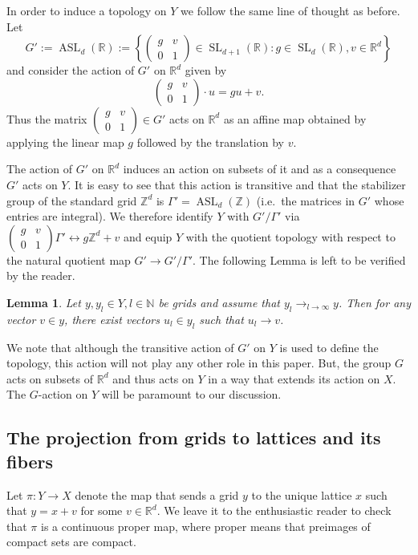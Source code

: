 \documentclass[reqno,11pt, twoside]{amsart}
\theoremstyle{plain}
\newtheorem{lem}[thm]{Lemma}
\theoremstyle{definition}
\theoremstyle{definition}
\theoremstyle{remark}
\numberwithin{equation}{section}
\newcommand{\SL}{\operatorname{SL}}
\newcommand{\Ga}{\Gamma}
\newcommand{\bR}{\mathbb{R}}
\newcommand{\bZ}{\mathbb{Z}}
\newcommand{\bN}{\mathbb{N}}
\newcommand\seta[1]{\left\{#1\right\}}
\newcommand\pa[1]{\left(#1\right)}
\newcommand\on[1]{\operatorname{#1}}
\newcommand\mat[1]{\pa{\begin{matrix}#1\end{matrix}}}
\newcommand\smallmat[1]{\pa{\begin{smallmatrix}#1\end{smallmatrix}}}
\begin{document}
In order to induce a topology on $Y$ we follow the same line of thought as before. Let 
$$G':=\on{ASL}_d(\bR) := \seta{\mat{g&v\\ 0&1}\in \SL_{d+1}(\bR):g\in \SL_d(\bR), v\in \bR^d}$$
and consider the action of $G'$ on $\bR^d$ given by 
$$\mat{g&v\\ 0&1}\cdot u = gu+v.$$
Thus the matrix $\smallmat{g&v\\0&1}\in G'$ acts on $\bR^d$ as an affine map obtained by applying the linear map $g$ followed by the translation by $v$.

The action of $G'$ on $\bR^d$ induces an action on subsets of it and as a consequence $G'$ acts on $Y$.
It is easy to see that this action is transitive and that the stabilizer group
of the standard grid $\bZ^d$ is $\Ga'=\on{ASL}_d(\bZ)$ (i.e.\ the matrices in 
$G'$ whose entries are integral). We therefore identify $Y$ with $G'/\Ga'$ 
via $\smallmat{g&v\\0&1}\Ga'\leftrightarrow g\bZ^d+v$ and equip $Y$ with the 
quotient topology with respect to the natural quotient map $G'\to G'/\Ga'$.
The following Lemma is left to be verified by the reader.
\begin{lem}
    \label{lem: vectors converge}
    Let $y, y_l\in Y, l\in \bN$ be grids and assume that $y_l\to_{l\to\infty} y$. Then for any vector $v\in y$, there exist vectors $u_l\in y_l$ such that $u_l\to v$. 
\end{lem}
We note that although the transitive action of $G'$ on $Y$ is used 
to define the topology, this action will not play any other role in this 
paper. But, the group $G$ acts on subsets of $\bR^d$ and thus acts on $Y$ in a way that extends its action on $X$. The $G$-action on $Y$ will be paramount to our discussion. 
\subsection{The projection from grids to lattices and its fibers}
Let $\pi:Y\to X$ denote the map that sends a grid $y$ to the unique lattice $x$ such that $y=x+v$ for some $v\in \bR^d$. 
We leave it to the enthusiastic reader to check that $\pi$ is a continuous
proper map, where proper means that preimages of compact sets are compact.
\end{document}
